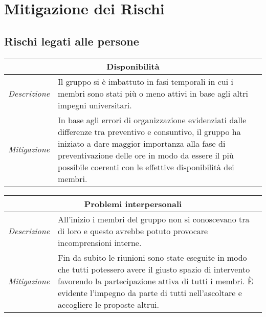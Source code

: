 \chapter{Mitigazione dei Rischi}

\section{Rischi legati alle persone}

\begin{table}[H]
    \centering
    \begin{tabular}{|p{2cm}|p{10cm}|}
    \hline
    \multicolumn{2}{|c|}{\textbf{Disponibilità}} \\ \hline
    \multicolumn{1}{|l|}{\textit{Descrizione}} & Il gruppo si è imbattuto in fasi temporali in cui i membri sono stati più o meno attivi in base agli altri impegni universitari. \\ \hline
    \multicolumn{1}{|l|}{\textit{Mitigazione}} & In base agli errori di organizzazione evidenziati dalle differenze tra preventivo e consuntivo, il gruppo ha iniziato a dare maggior importanza alla fase di preventivazione delle ore in modo da essere il più possibile coerenti con le effettive disponibilità dei membri. \\ \hline
    \end{tabular}
\end{table}

\begin{table}[H]
    \centering
    \begin{tabular}{|p{2cm}|p{10cm}|}
    \hline
    \multicolumn{2}{|c|}{\textbf{Problemi interpersonali}} \\ \hline
    \multicolumn{1}{|l|}{\textit{Descrizione}} & All'inizio i membri del gruppo non si conoscevano tra di loro e questo avrebbe potuto provocare incomprensioni interne. \\ \hline
    \multicolumn{1}{|l|}{\textit{Mitigazione}} & Fin da subito le riunioni sono state eseguite in modo che tutti potessero avere il giusto spazio di intervento favorendo la partecipazione attiva di tutti i membri. È evidente l'impegno da parte di tutti nell'ascoltare e accogliere le proposte altrui. \\ \hline
    \end{tabular}
\end{table}

